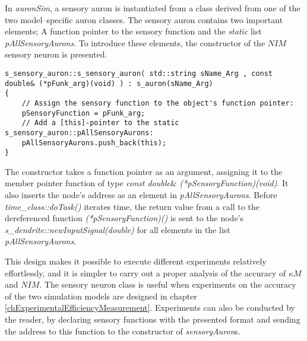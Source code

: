 			In \emph{auronSim}, a sensory auron is instantiated from a class derived from one of the two model--specific auron classes. %
			The sensory auron contains two important elements;
				A function pointer to the sensory function and the \emph{static} list \emph{pAllSensoryAurons}.
			To introduce these elements, the constructor of the $NIM$ sensory neuron is presented.
\begin{lstlisting}
s_sensory_auron::s_sensory_auron( std::string sName_Arg , const double& (*pFunk_arg)(void) ) : s_auron(sName_Arg)
{
    // Assign the sensory function to the object's function pointer: 
    pSensoryFunction = pFunk_arg;
    // Add a [this]-pointer to the static s_sensory_auron::pAllSensoryAurons:
    pAllSensoryAurons.push_back(this);
}
\end{lstlisting}


			The constructor takes a function pointer as an argument, assigning it to the member pointer function of type \emph{const double$\&$ (*pSensoryFunction)(void)}. 
			It also inserts the node's address as an element in \emph{pAllSensoryAurons}.
			Before \emph{time\_class::doTask()} iterates time, the return value from a call to the dereferenced function \emph{(*pSensoryFunction)()} 
				is sent to the node's \emph{s\_dendrite::newInputSignal(double)} for all elements in the list \emph{pAllSensoryAurons}.

			This design makes it possible to execute different experiments relatively effortlessly, and it is simpler to carry out a proper analysis of the accuracy of $\kappa M$ and $NIM$.
			The sensory neuron class is useful when experiments on the accuracy of the two simulation models are designed in chapter \ref{chExperimentalEfficiencyMeasurement}.
			Experiments can also be conducted by the reader, by declaring sensory functions with the presented format and sending the address to this function to the constructor of \emph{sensoryAuron}s. %
			
